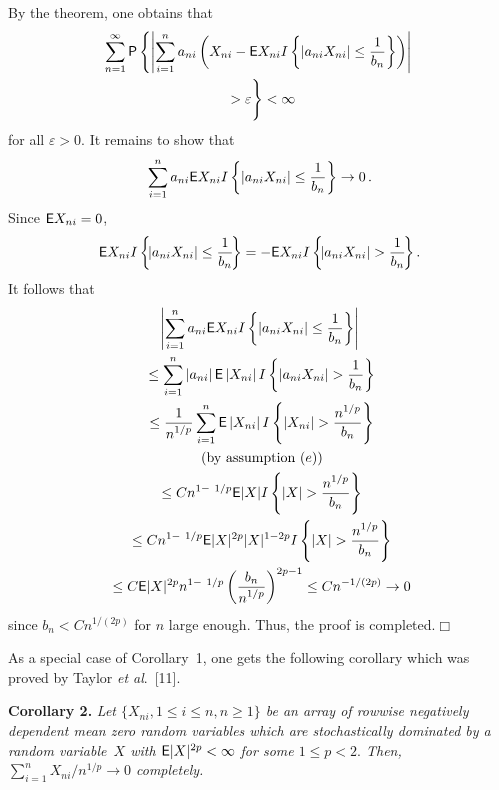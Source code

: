 \begin{multicols}{2}
By the theorem, one obtains that
\begin{multline*}
\hspace*{-1.55515pt}\sum\limits_{n=1}^\infty {\sf P}\left\{
\left\vert \sum\limits_{i=1}^n a_{ni}\left(X_{ni}- 
{\sf E}X_{ni}I\left\{\left\vert a_{ni}X_{ni}\right\vert \le \fr{1}{b_n}\right\}\right)
\right\vert\right.\\ 
\left.{}>\varepsilon 
\vphantom{\sum\limits_{i=1}^n}\right\}
<\infty
\end{multline*}
for all $\varepsilon>0$.
It remains to show that
$$ 
\sum\limits_{i=1}^n a_{ni}{\sf E}X_{ni}I\left\{|a_{ni}X_{ni}|\le \displaystyle\frac{\displaystyle 1\mathstrut}{\displaystyle b_n\mathstrut}\right\}\to 0\,. 
$$
Since ${\sf E}X_{ni}=0$,
$$
{\sf E}X_{ni}I\left\{\!|a_{ni}X_{ni}|\le \fr{1}{b_n}\!\right\}=
-{\sf E}X_{ni}I\left\{\!|a_{ni}X_{ni}|>\fr{1}{b_n}\!\right \}.
$$
It follows that
\begin{multline*}
\left\vert\sum\limits_{i=1}^n a_{ni}{\sf E}X_{ni}I
\left\{\left\vert a_{ni}X_{ni}\right\vert \le \fr{1}{b_n}\right\}\right\vert\\
{}\le\sum\limits_{i=1}^n \left\vert a_{ni}\right\vert {\sf E} \left\vert X_{ni}\right\vert
I\left\{\left\vert a_{ni}X_{ni}\right\vert > \fr{1}{b_n}\right\}\\
{}\le \fr{1}{n^{1/p}} \sum\limits_{i=1}^n {\sf E}\left\vert X_{ni}\right\vert
I\left\{\left\vert X_{ni}\right\vert>\fr{n^{1/p}}{b_n}\right\}\\
\mbox{ (by assumption ($e$))} \\
{}\le C n^{1 - \ 1/p} {\sf E}|X|I\left\{|X|>\fr{n^{1/p}}{b_n}\right\}\\
{}\le C n^{1 - \ 1/p} {\sf E}|X|^{2p} |X|^{1-2p} I\left\{|X|>\fr{n^{1/p}}{b_n}\right\} \\
{}\le C {\sf E}|X|^{2p} n^{1 - \ 1/p}\left(\fr{b_n}{n^{1/p}}\right)^{2p-1} \le C n^{-1/(2p)}\to 0
\end{multline*}
since $b_n<Cn^{1/(2p)}$ for $n$ large enough. Thus, the proof is completed.\hfill $\Box$

\medskip
As a special case of Corollary~1, one gets the following corollary which was proved by 
Taylor \textit{et al}.~[11].

\medskip

\noindent 
\textbf{Corollary 2.} \textit{Let $\{X_{ni}, 1\le i \le n, n\ge 1\}$ be an array of rowwise negatively dependent
mean zero random variables which are stochastically dominated by a random variable~$X$ with 
${\sf E}|X|^{2p}<\infty$
for some $1\le p<2.$ Then,
$\sum\limits_{i=1}^n {X_{ni}}/{n^{1/p}} \to 0$ completely.} 



\end{multicols}
